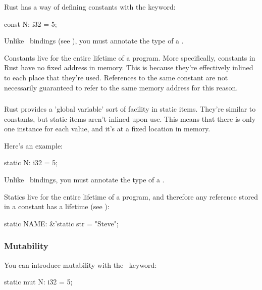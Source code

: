 Rust has a way of defining constants with the  keyword:

\begin{rustc}
const N: i32 = 5;
\end{rustc}

Unlike \keylet\ bindings (see ), you must annotate the type of a .

\blank

Constants live for the entire lifetime of a program. More specifically, constants in Rust have no fixed address in memory. This 
is because they're effectively inlined to each place that they're used. References to the same constant are not necessarily guaranteed 
to refer to the same memory address for this reason.

\subsubsection*{}

Rust provides a 'global variable' sort of facility in static items. They're similar to constants, but static items aren't inlined upon 
use. This means that there is only one instance for each value, and it's at a fixed location in memory.

\blank

Here's an example:

\begin{rustc}
static N: i32 = 5;
\end{rustc}

Unlike \keylet\ bindings, you must annotate the type of a .

\blank

Statics live for the entire lifetime of a program, and therefore any reference stored in a constant has a  lifetime
(see ):

\begin{rustc}
static NAME: &'static str = "Steve";
\end{rustc}

\subsubsection*{Mutability}

You can introduce mutability with the \mut\ keyword:

\begin{rustc}
static mut N: i32 = 5;
\end{rustc}

